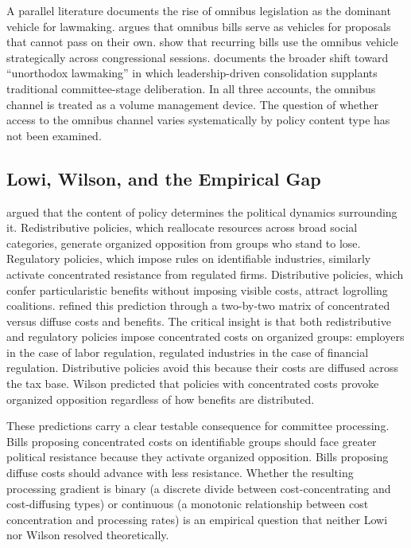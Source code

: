 \documentclass[11pt]{article}
\begin{document}
A parallel literature documents the rise of omnibus legislation as the dominant vehicle for lawmaking. \citet{krutz2001} argues that omnibus bills serve as vehicles for proposals that cannot pass on their own. \citet{krutz2006} show that recurring bills use the omnibus vehicle strategically across congressional sessions. \citet{sinclair2016} documents the broader shift toward ``unorthodox lawmaking'' in which leadership-driven consolidation supplants traditional committee-stage deliberation. In all three accounts, the omnibus channel is treated as a volume management device. The question of whether access to the omnibus channel varies systematically by policy content type has not been examined.

\subsection{Lowi, Wilson, and the Empirical Gap}

\citet{lowi1964} argued that the content of policy determines the political dynamics surrounding it. Redistributive policies, which reallocate resources across broad social categories, generate organized opposition from groups who stand to lose. Regulatory policies, which impose rules on identifiable industries, similarly activate concentrated resistance from regulated firms. Distributive policies, which confer particularistic benefits without imposing visible costs, attract logrolling coalitions. \citet{wilson1980} refined this prediction through a two-by-two matrix of concentrated versus diffuse costs and benefits. The critical insight is that both redistributive and regulatory policies impose concentrated costs on organized groups: employers in the case of labor regulation, regulated industries in the case of financial regulation. Distributive policies avoid this because their costs are diffused across the tax base. Wilson predicted that policies with concentrated costs provoke organized opposition regardless of how benefits are distributed.

These predictions carry a clear testable consequence for committee processing. Bills proposing concentrated costs on identifiable groups should face greater political resistance because they activate organized opposition. Bills proposing diffuse costs should advance with less resistance. Whether the resulting processing gradient is binary (a discrete divide between cost-concentrating and cost-diffusing types) or continuous (a monotonic relationship between cost concentration and processing rates) is an empirical question that neither Lowi nor Wilson resolved theoretically.
\end{document}

